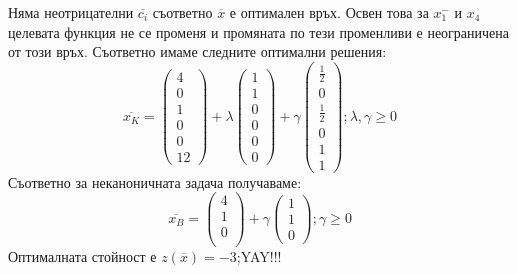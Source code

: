 \documentclass[12pt, a4paper]{article}
\begin{document}
Няма неотрицателни $\overline{c_i}$ съответно $\overline{x}$ е оптимален връх. Освен това за $x_1^-$ и $x_4$ целевата функция не се променя и промяната по тези променливи е неограничена от този връх. Съответно имаме следните оптимални решения:
\[
\overline{x_K}=\begin{pmatrix}4\\0\\1\\0\\0\\12\end{pmatrix}+
	\lambda\begin{pmatrix}1\\1\\0\\0\\0\\0\end{pmatrix}+
	\gamma\begin{pmatrix}\frac{1}{2}\\0\\ \frac{1}{2}\\0\\1\\1\end{pmatrix}; \lambda, \gamma \geq0
\]
Съответно за неканоничната задача получаваме:
\[
\overline{x_B}=\begin{pmatrix}4\\1\\0\\\end{pmatrix}+
	\gamma\begin{pmatrix}1\\ 1\\0\end{pmatrix}; \gamma\geq0
\]
Оптималната стойност е $z(\overline{x})=-3$;\quad\quad\quad\quad YAY!!!
\end{document}

